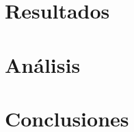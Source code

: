 \documentclass[letterpaper,11pt]{article}
\begin{document}
\section{Resultados}



\section{Análisis}

\section{Conclusiones}









%
\end{document}
